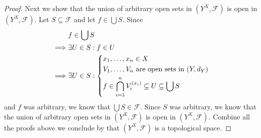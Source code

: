 \begin{proof}
  Next we show that the union of arbitrary open sets in \((Y^X, \mathcal{F})\) is open in \((Y^X, \mathcal{F})\).
  Let \(S \subseteq \mathcal{F}\) and let \(f \in \bigcup S\).
  Since
  \begin{align*}
             & f \in \bigcup S                                                                      \\
    \implies & \exists U \in S : f \in U                                                            \\
    \implies & \exists U \in S : \begin{dcases}
                                   x_1, \dots, x_n \in X                              \\
                                   V_1, \dots, V_n \text{ are open sets in } (Y, d_Y) \\
                                   f \in \bigcap_{i = 1}^n V_i^{(x_i)} \subseteq U \subseteq \bigcup S
                                 \end{dcases}
  \end{align*}
  and \(f\) was arbitrary, we know that \(\bigcup S \in \mathcal{F}\).
  Since \(S\) was arbitrary, we know that the union of arbitrary open sets in \((Y^X, \mathcal{F})\) is open in \((Y^X, \mathcal{F})\).
  Combine all the proofs above we conclude by  that \((Y^X, \mathcal{F})\) is a topological space.


\end{proof}
